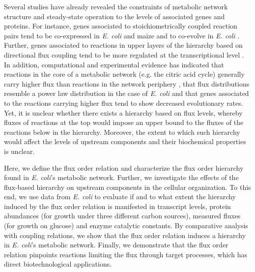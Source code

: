 \documentclass[12pt]{article}
\begin{document}
Several studies have already revealed the constraints of metabolic network structure and steady-state operation to the levels of associated genes and proteins.  For instance, genes associated to stoichiometrically coupled reaction pairs tend to be co-expressed in \emph{E. coli}\cite{Notebaart2008} and maize \cite{Robaina-Estevez2016} and to co-evolve in \emph{E. coli} \cite{Pal2005}. Further, genes associated to reactions in upper layers of the hierarchy based on directional flux coupling tend to be more regulated at the transcriptional level \cite{Hosseini2015}. In addition, computational and experimental evidence has indicated that reactions in the core of a metabolic network (e.g. the citric acid cycle) generally carry higher flux than reactions in the network periphery \cite{Vitkup2006a}, {\color{red} that flux distributions resemble a power law distribution in the case of \emph{E. coli} \cite{Almaas2004}} and that genes associated to the reactions carrying higher flux tend to show decreased evolutionary rates\cite{Vitkup2006a}. Yet, it is unclear whether there exists a hierarchy based on flux levels, whereby fluxes of reactions at the top would impose an upper bound to the fluxes of the reactions below in the hierarchy. Moreover, the extent to which such hierarchy would affect the levels of upstream components and their biochemical properties is unclear.

Here, we define the flux order relation and characterize the flux order hierarchy found in \emph{E. coli}'s metabolic network. Further, we investigate the effects of the flux-based hierarchy on upstream components in the cellular organization. To this end, we use data from \emph{E. coli} to evaluate if and to what extent the hierarchy induced by the flux order relation is manifested in transcript levels, protein abundances (for growth under three different carbon sources), measured fluxes (for growth on glucose) and enzyme catalytic constants. By comparative analysis with coupling relations, we show that the flux order relation induces a hierarchy in \emph{E. coli}'s metabolic network.  Finally, we demonstrate that the flux order relation pinpoints reactions limiting the flux through target processes, which has direct biotechnological applications.
\end{document}
